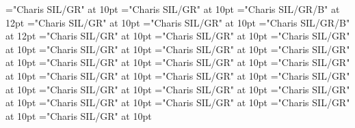 \documentclass[gps1,twoside]{article}
\begin{document}
\font\spanowningentrysummarydefinitionvisiblecomplexformbackrefvisiblecomplexformbackrefsminorentrycomplexfirstchildbefore="Charis SIL/GR" at 10pt
\font\spanowningentrysummarydefinitionvisiblecomplexformbackrefvisiblecomplexformbackrefsminorentrycomplexlastchildafter="Charis SIL/GR" at 10pt
\font\spanbzhheadwordminorentryvariant="Charis SIL/GR/B" at 12pt
\font\spanspanheadwordminorentryvariantbefore="Charis SIL/GR" at 10pt
\font\spanheadwordminorentryvariantlastchildafter="Charis SIL/GR" at 10pt
\font\spanheadwordminorentryvariant="Charis SIL/GR/B" at 12pt
\font\pronunciationpronunciationpronunciationsminorentryvariantbefore="Charis SIL/GR" at 10pt
\font\pronunciationsminorentryvariantafter="Charis SIL/GR" at 10pt
\font\spanspanformpronunciationpronunciationsminorentryvariantbefore="Charis SIL/GR" at 10pt
\font\spanformpronunciationpronunciationsminorentryvariantfirstchildbefore="Charis SIL/GR" at 10pt
\font\spanformpronunciationpronunciationsminorentryvariantlastchildafter="Charis SIL/GR" at 10pt
\font\spanspanvariantformentrybackrefsminorentryvariantbefore="Charis SIL/GR" at 10pt
\font\variantformentrybackrefsminorentryvariantbefore="Charis SIL/GR" at 10pt
\font\variantformentrybackrefsminorentryvariantafter="Charis SIL/GR" at 10pt
\font\variantentrytypevariantentrytypevariantentrytypesvariantformentrybackrefvariantformentrybackrefsminorentryvariantbefore="Charis SIL/GR" at 10pt
\font\variantentrytypesvariantformentrybackrefvariantformentrybackrefsminorentryvariantafter="Charis SIL/GR" at 10pt
\font\spanspanreverseabbrvariantentrytypevariantentrytypesvariantformentrybackrefvariantformentrybackrefsminorentryvariantbefore="Charis SIL/GR" at 10pt
\font\spanreverseabbrvariantentrytypevariantentrytypesvariantformentrybackrefvariantformentrybackrefsminorentryvariantlastchildafter="Charis SIL/GR" at 10pt
\font\spanspanheadwordvariantformentrybackrefvariantformentrybackrefsminorentryvariantbefore="Charis SIL/GR" at 10pt
\font\spanspanowningentrysummarydefinitionvariantformentrybackrefvariantformentrybackrefsminorentryvariantbefore="Charis SIL/GR" at 10pt
\font\spanowningentrysummarydefinitionvariantformentrybackrefvariantformentrybackrefsminorentryvariantlastchildafter="Charis SIL/GR" at 10pt
\font\spanspanvisiblevariantentryrefsminorentryvariantbefore="Charis SIL/GR" at 10pt
\font\visiblevariantentryrefsminorentryvariantafter="Charis SIL/GR" at 10pt
\font\variantentrytypevariantentrytypevariantentrytypesvisiblevariantentryrefvisiblevariantentryrefsminorentryvariantbefore="Charis SIL/GR" at 10pt
\font\variantentrytypesvisiblevariantentryrefvisiblevariantentryrefsminorentryvariantafter="Charis SIL/GR" at 10pt
\end{document}
